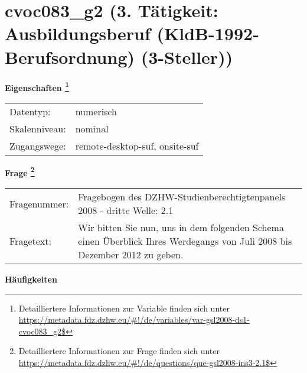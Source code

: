 
    \setcounter{footnote}{0}

    \vspace*{-1.8cm}
	\section{cvoc083\_g2 (3. Tätigkeit: Ausbildungsberuf (KldB-1992-Berufsordnung) (3-Steller))}
	\label{section:cvoc083_g2}



    \vspace*{0.5cm}
    \noindent\textbf{Eigenschaften
	\footnote{Detailliertere Informationen zur Variable finden sich unter
		\url{https://metadata.fdz.dzhw.eu/\#!/de/variables/var-gsl2008-ds1-cvoc083_g2$}}}\\
	\begin{tabularx}{\hsize}{@{}lX}
	Datentyp: & numerisch \\
	Skalenniveau: & nominal \\
	Zugangswege: &
	  remote-desktop-suf, 
	  onsite-suf
 \\
    \end{tabularx}



				\vspace*{0.5cm}
                \noindent\textbf{Frage
	                \footnote{Detailliertere Informationen zur Frage finden sich unter
		              \url{https://metadata.fdz.dzhw.eu/\#!/de/questions/que-gsl2008-ins3-2.1$}}}\\
				\begin{tabularx}{\hsize}{@{}lX}
					Fragenummer: &
					  Fragebogen des DZHW-Studienberechtigtenpanels 2008 - dritte Welle:
					  2.1
 \\
					Fragetext: & Wir bitten Sie nun, uns in dem folgenden Schema einen Überblick Ihres Werdegangs von Juli 2008 bis Dezember 2012 zu geben. \\
				\end{tabularx}





        		\vspace*{0.5cm}
                \noindent\textbf{Häufigkeiten}

